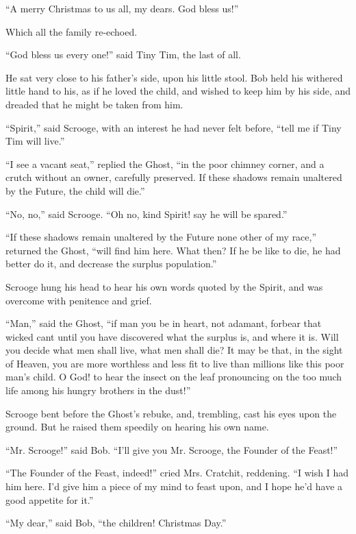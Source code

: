 \documentclass[paper=a5,BCOR=15mm,twoside,DIV=15,headinclude=off,12pt,chapterprefix=off,openany,headings=huge]{scrbook} %
\begin{document}
\enquote{A merry Christmas to us all, my dears. God bless us!}

Which all the family re-echoed.

\enquote{God bless us every one!} said Tiny Tim, the last of all.

He sat very close to his father's side, upon his little stool. Bob held his withered little hand to his, as if he loved the child, and wished to keep him by his side, and dreaded that he might be taken from him.

\enquote{Spirit,} said Scrooge, with an interest he had never felt before, \enquote{tell me if Tiny Tim will live.}

\enquote{I see a vacant seat,} replied the Ghost, \enquote{in the poor chimney corner, and a crutch without an owner, carefully preserved. If these shadows remain unaltered by the Future, the child will die.}

\enquote{No, no,} said Scrooge. \enquote{Oh no, kind Spirit! say he will be spared.}

\enquote{If these shadows remain unaltered by the Future none other of my race,} returned the Ghost, \enquote{will find him here. What then? If he be like to die, he had better do it, and decrease the surplus population.}

Scrooge hung his head to hear his own words quoted by the Spirit, and was overcome with penitence and grief.

\enquote{Man,} said the Ghost, \enquote{if man you be in heart, not adamant, forbear that wicked cant until you have discovered what the surplus is, and where it is. Will you decide what men shall live, what men shall die? It may be that, in the sight of Heaven, you are more worthless and less fit to live than millions like this poor man's child. O God! to hear the insect on the leaf pronouncing on the too much life among his hungry brothers in the dust!}

Scrooge bent before the Ghost's rebuke, and, trembling, cast his eyes upon the ground. But he raised them speedily on hearing his own name.

\enquote{Mr. Scrooge!} said Bob. \enquote{I'll give you Mr. Scrooge, the Founder of the Feast!}

\enquote{The Founder of the Feast, indeed!} cried Mrs. Cratchit, reddening. \enquote{I wish I had him here. I'd give him a piece of my mind to feast upon, and I hope he'd have a good appetite for it.}

\enquote{My dear,} said Bob, \enquote{the children! Christmas Day.}
\end{document}
